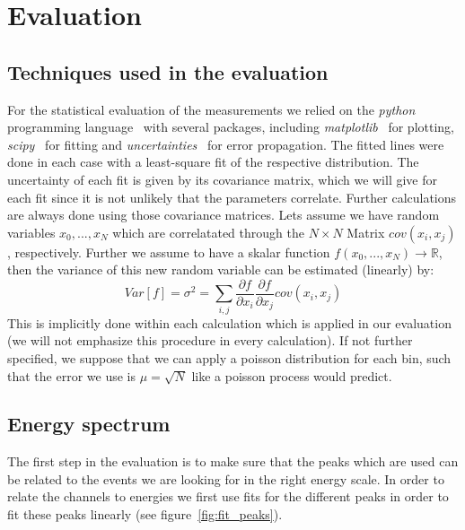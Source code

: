\section{Evaluation}
\subsection{Techniques used in the evaluation}
For the statistical evaluation of the measurements we relied on the \textit{python} programming language~
\cite{python} with several packages, including \textit{matplotlib}~\cite{Hunter2007} for plotting,
 \textit{scipy}~\cite{scipy} for fitting and \textit{uncertainties}~\cite{uc} for error propagation. 
The fitted lines
were done in each case with a least-square fit of the respective distribution. The uncertainty of each fit
is given by its covariance matrix, which we will give for each fit since it is not unlikely that the parameters
correlate. Further calculations are always done using those covariance matrices. Lets assume we have random
variables $x_0,...,x_N$ which are correlatated through the $N\times N$ Matrix $cov(x_i,x_j)$, respectively.
Further we assume to have a skalar function $f(x_0,...,x_N) \rightarrow \mathbb{R}$, then the variance
of this new random variable can be estimated (linearly) by:
\begin{equation}
Var[f] = \sigma^2 = \sum_{i,j} \frac{\partial f}{\partial x_i} \frac{\partial f}{\partial x_j} cov(x_i,x_j)
\end{equation} 
This is implicitly done within each calculation which is applied in our evaluation (we will not emphasize this
procedure in every calculation). If not further specified, we suppose that we can apply a poisson distribution
for each bin, such that the error we use is $\mu = \sqrt{N}$ like a poisson process would predict.
\subsection{Energy spectrum}
The first step in the evaluation is to make sure that the peaks which are used can be related
to the events we are looking for in the right energy scale.
In order to relate the channels to
 energies we first use fits for the different peaks in order
to fit these peaks linearly (see figure~\ref{fig:fit_peaks}). 


